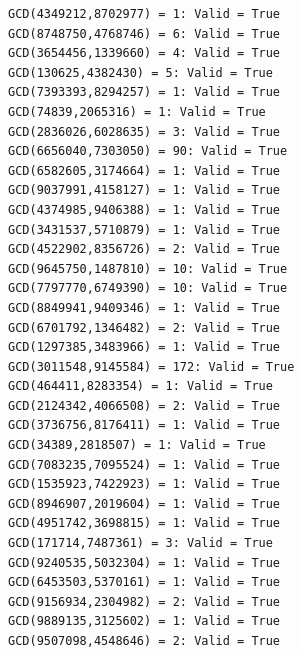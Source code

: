 \documentclass{article}
\begin{document}
\begin{enumerate}
\begin{enumerate}
\begin{lstlisting}
GCD(4349212,8702977) = 1: Valid = True
GCD(8748750,4768746) = 6: Valid = True
GCD(3654456,1339660) = 4: Valid = True
GCD(130625,4382430) = 5: Valid = True
GCD(7393393,8294257) = 1: Valid = True
GCD(74839,2065316) = 1: Valid = True
GCD(2836026,6028635) = 3: Valid = True
GCD(6656040,7303050) = 90: Valid = True
GCD(6582605,3174664) = 1: Valid = True
GCD(9037991,4158127) = 1: Valid = True
GCD(4374985,9406388) = 1: Valid = True
GCD(3431537,5710879) = 1: Valid = True
GCD(4522902,8356726) = 2: Valid = True
GCD(9645750,1487810) = 10: Valid = True
GCD(7797770,6749390) = 10: Valid = True
GCD(8849941,9409346) = 1: Valid = True
GCD(6701792,1346482) = 2: Valid = True
GCD(1297385,3483966) = 1: Valid = True
GCD(3011548,9145584) = 172: Valid = True
GCD(464411,8283354) = 1: Valid = True
GCD(2124342,4066508) = 2: Valid = True
GCD(3736756,8176411) = 1: Valid = True
GCD(34389,2818507) = 1: Valid = True
GCD(7083235,7095524) = 1: Valid = True
GCD(1535923,7422923) = 1: Valid = True
GCD(8946907,2019604) = 1: Valid = True
GCD(4951742,3698815) = 1: Valid = True
GCD(171714,7487361) = 3: Valid = True
GCD(9240535,5032304) = 1: Valid = True
GCD(6453503,5370161) = 1: Valid = True
GCD(9156934,2304982) = 2: Valid = True
GCD(9889135,3125602) = 1: Valid = True
GCD(9507098,4548646) = 2: Valid = True    
        \end{lstlisting}
    \end{enumerate}
  \end{enumerate}  %
\end{document}

